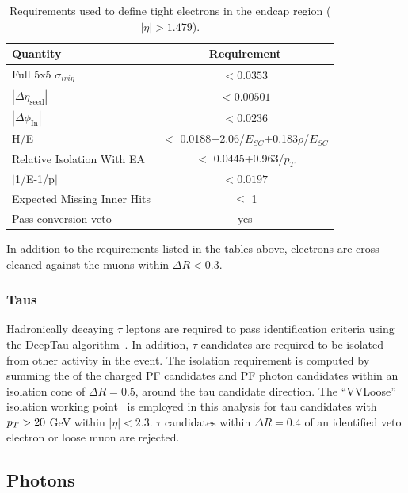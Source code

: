 \begin{table}[htbp]
\centering
\def\arraystretch{1.2}
\begin{tabular}{|l|c|}
    \hline\hline
    Quantity & Requirement \\\hline
    Full 5x5 $\sigma_{i\eta i\eta}$ &  $< 0.0353$ \\
    $|\Delta\eta_{\mathrm{seed}}|$ & $< 0.00501$  \\
    $|\Delta\phi_{\mathrm{In}}|$ & $< 0.0236$ \\
    H/E & $<$ 0.0188+2.06/$E_{SC}$+0.183$\rho$/$E_{SC}$ \\
    Relative Isolation With EA & $<$ 0.0445+0.963/$p_T$ \\
    $|$1/E-1/p$|$ & $< 0.0197$ \\
    Expected Missing Inner Hits & $\leq$ 1 \\
    Pass conversion veto & yes \\
    \hline\hline
\end{tabular}
\caption{Requirements used to define tight electrons in the endcap region ($|\eta| > 1.479$).}
\label{tab:tight_electron_def_endcap}
\end{table}

In addition to the requirements listed in the tables above, electrons are cross-cleaned against the muons
within $\Delta R < 0.3$.

\subsubsection{Taus}

Hadronically decaying $\tau$ leptons are required to pass identification criteria
using the DeepTau algorithm~\cite{CMS-DP-2019-033}. In addition, $\tau$ candidates are required to be isolated from other activity in the
event. The isolation requirement is computed by summing the \pt of the charged PF
candidates and PF photon candidates within an isolation cone of $\Delta R = 0.5$,
around the tau candidate direction. 
The ``VVLoose'' isolation working point~\cite{taupog_twiki} is employed in this analysis
for tau candidates with $p_T > 20$ GeV within $|\eta| < 2.3$. $\tau$ candidates within $\Delta R = 0.4$ of 
an identified veto electron or loose muon are rejected.

\subsection{Photons}
\label{subsec:photons}

